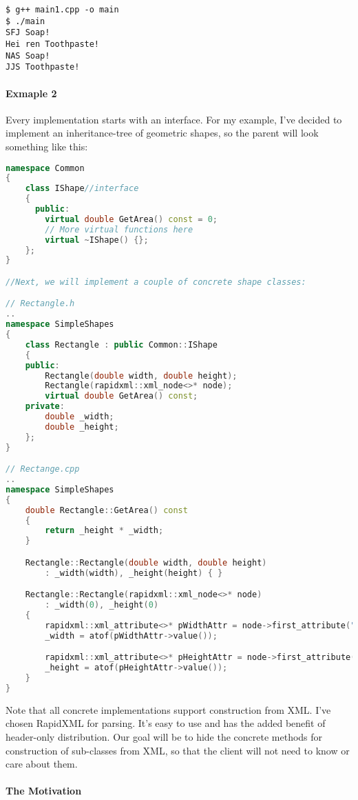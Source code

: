\documentclass{book}
\begin{document}
\begin{verbatim}
$ g++ main1.cpp -o main
$ ./main
SFJ Soap!
Hei ren Toothpaste!
NAS Soap!
JJS Toothpaste!
\end{verbatim}

\paragraph{Exmaple 2}
Every implementation starts with an interface. For my example, I’ve decided to implement an inheritance-tree of geometric shapes, so the parent will look something like this:
\begin{lstlisting}[caption={Abstract Factory Pattern sample 2-1}, language=C++]
namespace Common
{
    class IShape//interface
    {
      public:
        virtual double GetArea() const = 0;
        // More virtual functions here
        virtual ~IShape() {};
    };
}

//Next, we will implement a couple of concrete shape classes:

// Rectangle.h
..
namespace SimpleShapes
{
    class Rectangle : public Common::IShape
    {
    public:
        Rectangle(double width, double height);
        Rectangle(rapidxml::xml_node<>* node);
        virtual double GetArea() const;
    private:
        double _width;
        double _height;
    };
}

// Rectange.cpp
..
namespace SimpleShapes
{
    double Rectangle::GetArea() const
    {
        return _height * _width;
    }

    Rectangle::Rectangle(double width, double height) 
        : _width(width), _height(height) { }

    Rectangle::Rectangle(rapidxml::xml_node<>* node)
        : _width(0), _height(0)
    {
        rapidxml::xml_attribute<>* pWidthAttr = node->first_attribute("Width");
        _width = atof(pWidthAttr->value());

        rapidxml::xml_attribute<>* pHeightAttr = node->first_attribute("Height");
        _height = atof(pHeightAttr->value());
    }
}
\end{lstlisting}

Note that all concrete implementations support construction from XML.  I’ve chosen RapidXML for parsing. It’s easy to use and has the added benefit of header-only distribution.
Our goal will be to hide the concrete methods for construction of sub-classes from XML, so that the client will not need to know or care about them.
\paragraph{The Motivation}
\end{document}
